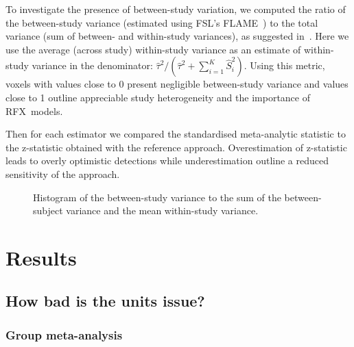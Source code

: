 \documentclass[preprint]{elsarticle}
\newcommand{\vareffect}[1][i]{\hat S^2_{#1}}
\newcommand{\nStudies}{K}
\newcommand{\estvarBetween}{\hat\tau^2}
\begin{document}




To investigate the presence of between-study variation, we computed the ratio of the between-study variance (estimated using FSL's FLAME~\cite{Smith2001}) to the total variance (sum of between- and within-study variances), as suggested in~\cite{Chen2012}. Here we use the average (across study) within-study variance as an estimate of within-study variance in the denominator:
$\estvarBetween / (\estvarBetween + \sum_{i=1}^{\nStudies} \vareffect)$.
Using this metric, voxels with values close to 0 present negligible between-study variance and values close to 1 outline appreciable study heterogeneity and the importance of RFX~models.

Then for each estimator we compared the standardised meta-analytic statistic to the z-statistic obtained with the reference approach. Overestimation of z-statistic leads to overly optimistic detections while underestimation outline a reduced sensitivity of the approach. 

\begin{figure}[t]
	\centering
	\caption{Histogram of the between-study variance to the sum of the between-subject variance and the mean within-study variance.}
	\label{fig_realdata_variances}
\end{figure}

\section{Results}\label{sec_res}

\subsection{How bad is the units issue?}

\subsubsection{Group meta-analysis}
\end{document}
